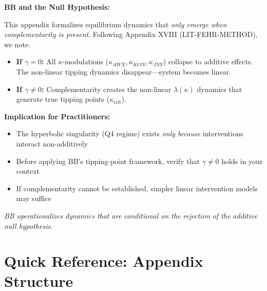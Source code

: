 \documentclass[11pt, a4paper]{article}
\begin{document}

\begin{tcolorbox}[colback=red!5!white, colframe=red!75!black,
    title=\textbf{Methodological Note: Exclusion Principle (Appendix XVIII)}]

\textbf{BB and the Null Hypothesis:}

This appendix formalizes equilibrium dynamics that \textit{only emerge when complementarity is present}.
Following Appendix XVIII (LIT-FEHR-METHOD), we note:

\begin{itemize}[nosep]
    \item \textbf{If $\gamma = 0$:} All $\kappa$-modulations ($\kappa_{AWX}, \kappa_{KON}, \kappa_{JNY}$) collapse to additive effects. The non-linear tipping dynamics disappear---system becomes linear.
    \item \textbf{If $\gamma \neq 0$:} Complementarity creates the non-linear $\lambda(\kappa)$ dynamics that generate true tipping points ($\kappa_{\text{crit}}$).
\end{itemize}

\medskip
\textbf{Implication for Practitioners:}
\begin{itemize}[nosep]
    \item The hyperbolic singularity (Q4 regime) exists \textit{only because} interventions interact non-additively
    \item Before applying BB's tipping-point framework, verify that $\gamma \neq 0$ holds in your context
    \item If complementarity cannot be established, simpler linear intervention models may suffice
\end{itemize}

\textit{BB operationalizes dynamics that are conditional on the rejection of the additive null hypothesis.}
\end{tcolorbox}


\section*{Quick Reference: Appendix Structure}
\end{document}
